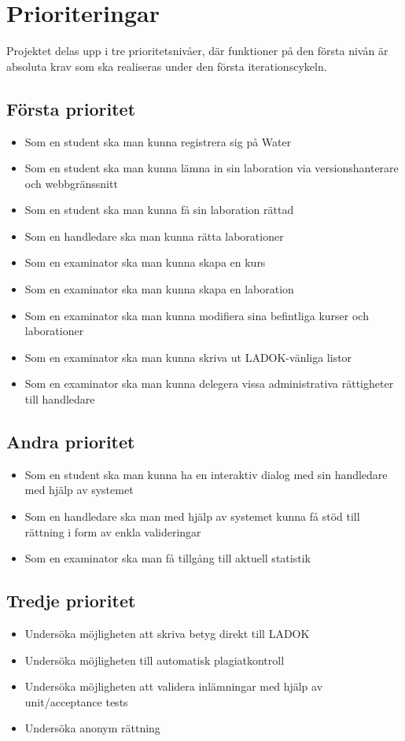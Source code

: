 \section{Prioriteringar}

Projektet delas upp i tre prioritetsnivåer, där funktioner på den första nivån är absoluta krav som ska realiseras under den första iterationscykeln.

\subsection{Första prioritet}

\begin{itemize}
\item Som en student ska man kunna registrera sig på Water
\item Som en student ska man kunna lämna in sin laboration via versionshanterare och webbgränssnitt
\item Som en student ska man kunna få sin laboration rättad
\item Som en handledare ska man kunna rätta laborationer
\item Som en examinator ska man kunna skapa en kurs
\item Som en examinator ska man kunna skapa en laboration
\item Som en examinator ska man kunna modifiera sina befintliga kurser och laborationer
\item Som en examinator ska man kunna skriva ut LADOK-vänliga listor
\item Som en examinator ska man kunna delegera vissa administrativa rättigheter till handledare
\end{itemize}

\subsection{Andra prioritet}

\begin{itemize}
\item Som en student ska man kunna ha en interaktiv dialog med sin handledare med hjälp av systemet
\item Som en handledare ska man med hjälp av systemet kunna få stöd till rättning i form av enkla valideringar
\item Som en examinator ska man få tillgång till aktuell statistik
\end{itemize}

\subsection{Tredje prioritet}

\begin{itemize}
\item Undersöka möjligheten att skriva betyg direkt till LADOK
\item Undersöka möjligheten till automatisk plagiatkontroll
\item Undersöka möjligheten att validera inlämningar med hjälp av unit/acceptance tests
\item Undersöka anonym rättning
\end{itemize}

